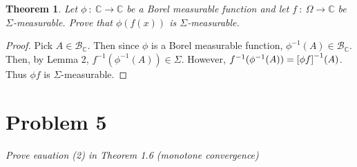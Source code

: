 \documentclass[12pt]{article}
\theoremstyle{plain}
\newtheorem{theorem}{Theorem}
\begin{document}
\begin{theorem}
    Let $\phi\ :\ \mathbb{C} \rightarrow \mathbb{C}$ be a Borel measurable function and let $f\ :\ \Omega \rightarrow \mathbb{C}$ be $\Sigma$-measurable.  Prove that $\phi(f(x))$ is $\Sigma$-measurable.
\end{theorem}
\begin{proof}
    Pick $A \in \mathcal{B}_\mathbb{C}$.  Then since $\phi$ is a Borel measurable function, $\phi^{-1}(A) \in \mathcal{B}_\mathbb{C}$.  Then, by Lemma 2, $f^{-1}(\phi^{-1}(A))\in \Sigma$.  However, $f^{-1}(\phi^{-1}(A)) = \qty[\phi f]^{-1}(A)$.  Thus $\phi f$ is $\Sigma$-measurable.
\end{proof}

\section*{Problem 5}
\textit{Prove eauation (2) in Theorem 1.6 (monotone convergence)}
\end{document}
